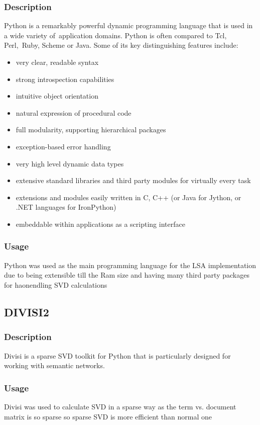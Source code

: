 \subsubsection{Description}
Python is a remarkably powerful dynamic programming language that is used in a wide variety of application domains. Python is often compared to Tcl, Perl, Ruby, Scheme or Java. Some of its key distinguishing features include:
\begin{itemize}
\item very clear, readable syntax
\item strong introspection capabilities
\item intuitive object orientation
\item natural expression of procedural code
\item full modularity, supporting hierarchical packages
\item exception-based error handling
\item very high level dynamic data types
\item extensive standard libraries and third party modules for virtually every task
\item extensions and modules easily written in C, C++ (or Java for Jython, or .NET languages for IronPython)
\item embeddable within applications as a scripting interface
\end{itemize}
\subsubsection{Usage}
Python was used as the main programming language for the LSA implementation due to being extensible till the Ram size and having many third party packages for haonendling SVD calculations
\subsection{DIVISI2}
\subsubsection{Description}
Divisi is a sparse SVD toolkit for Python that is particularly designed for working with semantic networks.
\subsubsection{Usage}
Divisi was used to calculate SVD in a sparse way as the term vs. document matrix is so sparse so sparse SVD is more efficient than normal one
